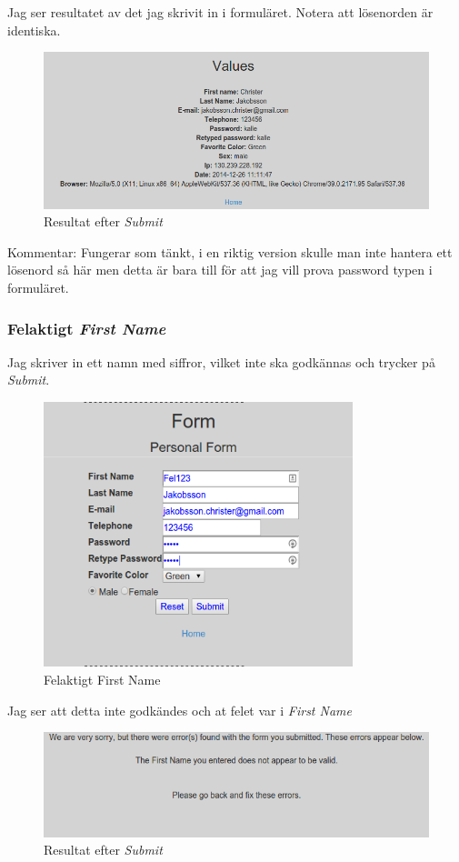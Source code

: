 \documentclass[11pt, titlepage, oneside, a4paper]{article}
\newcommand{\Subsubsection}[1]{\vspace{-4pt}\subsubsection{#1}\vspace{-8pt}}
\begin{document}
		  Jag ser resultatet av det jag skrivit in i formuläret. Notera att lösenorden är identiska.
		  \begin{figure}[ht!]
		  \centering
		  \includegraphics[width=120mm]{del1_result.png}
		  \caption{Resultat efter \emph{Submit}}
		  \end{figure}
		  
		  Kommentar: Fungerar som tänkt, i en riktig version skulle man inte hantera ett lösenord så här men detta är bara till för att jag vill prova password typen i formuläret.
		\newpage
		\Subsubsection{Felaktigt \emph{First Name}}
		Jag skriver in ett namn med siffror, vilket inte ska godkännas och trycker på \emph{Submit}.
		\begin{figure}[ht!]
		\centering
		\includegraphics[width=90mm]{del1_first_name_fel.png}
		\caption{Felaktigt First Name}
		\end{figure}

		Jag ser att detta inte godkändes och at felet var i \emph{First Name}
		\begin{figure}[ht!]
		\centering
		\includegraphics[width=120mm]{del1_first_name_fel_result.png}
		\caption{Resultat efter \emph{Submit}}
		\end{figure}
		
\end{document}
